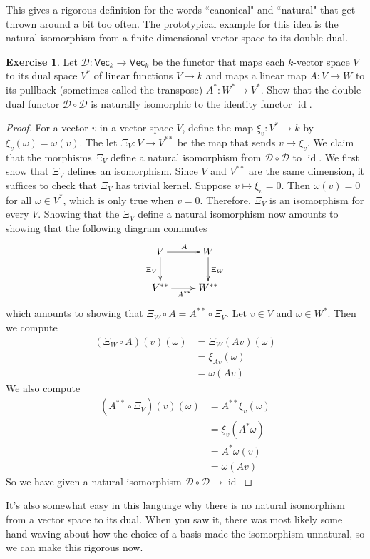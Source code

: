 \documentclass[psamsfonts]{amsart}
\theoremstyle{definition}
\newtheorem{exer}[thm]{Exercise}
\theoremstyle{remark}
\DeclareMathOperator{\id}{id}
\begin{document}
This gives a rigorous definition for the words ``canonical" and ``natural" that get thrown around a bit too often. The prototypical example for this idea is the natural isomorphism from a finite dimensional vector space to its double dual.
%
\begin{exer}
Let $\mathcal{D}: \mathsf{Vec}_k \to \mathsf{Vec}_k$ be the functor that maps each $k$-vector space $V$ to its dual space $V^*$ of linear functions $V \to k$ and maps a linear map $A: V \to W$ to its pullback (sometimes called the transpose) $A^*: W^* \to V^*$. Show that the double dual functor $\mathcal{D} \circ \mathcal{D}$ is naturally isomorphic to the identity functor $\id$.
\end{exer}
%
\begin{proof}
For a vector $v$ in a vector space $V$, define the map $\xi_v: V^* \to k$ by $\xi_v(\omega) = \omega(v)$. The let $\Xi_V: V \to V^{**}$ be the map that sends $v \mapsto \xi_v$. We claim that the morphisms $\Xi_V$ define a natural isomorphism from $\mathcal{D} \circ \mathcal{D}$ to $\id$. We first show that $\Xi_V$ defines an isomorphism. Since $V$ and $V^{**}$ are the same dimension, it suffices to check that $\Xi_V$ has trivial kernel. Suppose $v \mapsto \xi_v = 0$. Then $\omega(v) = 0$ for all $\omega \in V^*$, which is only true when $v = 0$. Therefore, $\Xi_V$ is an isomorphism for every $V$. Showing that the $\Xi_V$ define a natural isomorphism now amounts to showing that the following diagram commutes
$$\xymatrix{
V \ar[r]^A \ar[d]_{\Xi_V} & W \ar[d]^{\Xi_W} \\
V^{**} \ar[r]_{A^{**}} & W^{**}
}$$
which amounts to showing that $\Xi_W \circ A = A^{**} \circ \Xi_V$. Let $v \in V$ and $\omega \in W^*$. Then we compute
\begin{align*}
(\Xi_W \circ A)(v)(\omega) &= \Xi_W(Av)(\omega) \\
&= \xi_{Av}(\omega) \\
&= \omega(Av)
\end{align*}
We also compute
\begin{align*}
(A^{**} \circ \Xi_V)(v)(\omega) &= A^{**}\xi_v(\omega) \\
&= \xi_v(A^{*}\omega) \\
&= A^{*}\omega(v) \\
&= \omega(Av)
\end{align*}
So we have given a natural isomorphism $\mathcal{D} \circ \mathcal{D} \to \id$
\end{proof}
%
It's also somewhat easy in this language why there is no natural isomorphism from a vector space to its dual. When you saw it, there was most likely some hand-waving about how the choice of a basis made the isomorphism unnatural, so we can make this rigorous now.
\end{document}
